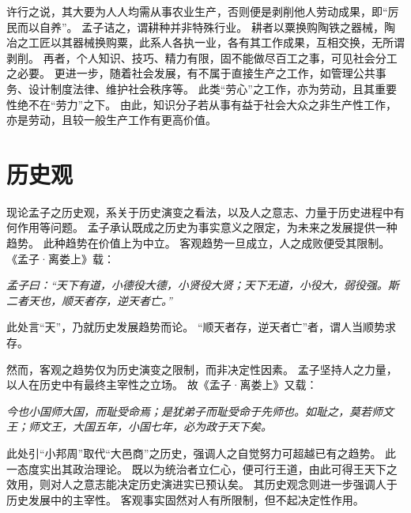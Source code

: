 \documentclass[11pt]{article}
\begin{document}
许行之说，其大要为人人均需从事农业生产，否则便是剥削他人劳动成果，即“厉民而以自养”。
孟子诘之，谓耕种并非特殊行业。
耕者以粟换购陶铁之器械，陶冶之工匠以其器械换购粟，此系人各执一业，各有其工作成果，互相交换，无所谓剥削。
再者，个人知识、技巧、精力有限，固不能做尽百工之事，可见社会分工之必要。
更进一步，随着社会发展，有不属于直接生产之工作，如管理公共事务、设计制度法律、维护社会秩序等。
此类“劳心”之工作，亦为劳动，且其重要性绝不在“劳力”之下。
由此，知识分子若从事有益于社会大众之非生产性工作，亦是劳动，且较一般生产工作有更高价值。
  
\section{历史观}
现论孟子之历史观，系关于历史演变之看法，以及人之意志、力量于历史进程中有何作用等问题。
孟子承认既成之历史为事实意义之限定，为未来之发展提供一种趋势。
此种趋势在价值上为中立。
客观趋势一旦成立，人之成败便受其限制。
《孟子·离娄上》载：

\textit{孟子曰：“天下有道，小德役大德，小贤役大贤；天下无道，小役大，弱役强。斯二者天也，顺天者存，逆天者亡。”}

此处言“天”，乃就历史发展趋势而论。
“顺天者存，逆天者亡”者，谓人当顺势求存。

\par

然而，客观之趋势仅为历史演变之限制，而非决定性因素。
孟子坚持人之力量，以人在历史中有最终主宰性之立场。
故《孟子·离娄上》又载：

\textit{今也小国师大国，而耻受命焉；是犹弟子而耻受命于先师也。如耻之，莫若师文王；师文王，大国五年，小国七年，必为政于天下矣。}

此处引“小邦周”取代“大邑商”之历史，强调人之自觉努力可超越已有之趋势。
此一态度实出其政治理论。
既以为统治者立仁心，便可行王道，由此可得王天下之效用，则对人之意志能决定历史演进实已预认矣。
其历史观念则进一步强调人于历史发展中的主宰性。
客观事实固然对人有所限制，但不起决定性作用。
\end{document}
